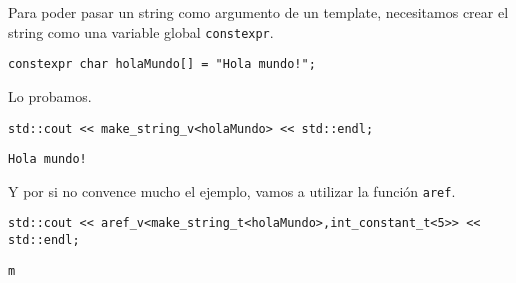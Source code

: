 \documentclass[11pt]{article}
\begin{document}
Para poder pasar un string como argumento de un template, necesitamos crear el string como una variable global \texttt{constexpr}.

\begin{verbatim}
constexpr char holaMundo[] = "Hola mundo!";
\end{verbatim}

Lo probamos.

\begin{verbatim}
std::cout << make_string_v<holaMundo> << std::endl;
\end{verbatim}

\begin{verbatim}
Hola mundo!
\end{verbatim}


Y por si no convence mucho el ejemplo, vamos a utilizar la función \texttt{aref}.

\begin{verbatim}
std::cout << aref_v<make_string_t<holaMundo>,int_constant_t<5>> << std::endl;
\end{verbatim}

\begin{verbatim}
m
\end{verbatim}
\end{document}
